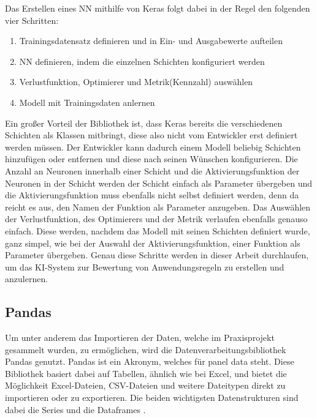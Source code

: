 Das Erstellen eines \ac{NN} mithilfe von Keras folgt dabei in der Regel den folgenden vier Schritten:
\begin{enumerate}
    \item Trainingsdatensatz definieren und in Ein- und Ausgabewerte aufteilen \cite[vgl. S.92]{DL_PY}
    \item \ac{NN} definieren, indem die einzelnen Schichten konfiguriert werden \cite[vgl. S.92]{DL_PY}
    \item Verlustfunktion, Optimierer und Metrik(Kennzahl) auswählen \cite[vgl. S.92]{DL_PY}
    \item Modell mit Trainingsdaten anlernen \cite[vgl. S.92]{DL_PY}
\end{enumerate}
Ein großer Vorteil der Bibliothek ist, dass Keras bereits die verschiedenen Schichten als Klassen mitbringt, diese also nicht vom Entwickler erst definiert werden müssen.
Der Entwickler kann dadurch einem Modell beliebig Schichten hinzufügen oder entfernen und diese nach seinen Wünschen konfigurieren. 
Die Anzahl an Neuronen innerhalb einer Schicht und die Aktivierungsfunktion der Neuronen in der Schicht werden der Schicht einfach als Parameter übergeben 
und die Aktivierungsfunktion muss ebenfalls nicht selbst definiert werden, denn da reicht es aus, den Namen der Funktion als Parameter anzugeben.
Das Auswählen der Verlustfunktion, des Optimierers und der Metrik verlaufen ebenfalls genauso einfach. Diese werden, nachdem das Modell mit seinen Schichten 
definiert wurde, ganz simpel, wie bei der Auswahl der Aktivierungsfunktion, einer Funktion als Parameter übergeben.
Genau diese Schritte werden in dieser Arbeit durchlaufen, um das \ac{KI}-System zur Bewertung von Anwendungsregeln zu erstellen und anzulernen.

\subsection{Pandas}

Um unter anderem das Importieren der Daten, welche im Praxisprojekt gesammelt wurden, zu ermöglichen, wird die Datenverarbeitungsbibliothek Pandas genutzt.
Pandas ist ein Akronym, welches für panel data steht. Diese Bibliothek basiert dabei auf Tabellen, ähnlich wie bei Excel, und bietet die Möglichkeit
Excel-Dateien, CSV-Dateien und weitere Dateitypen direkt zu importieren oder zu exportieren. Die beiden wichtigsten Datenstrukturen sind dabei die
Series und die Dataframes \cite[vgl. S.253]{NumerischesPython}. 

